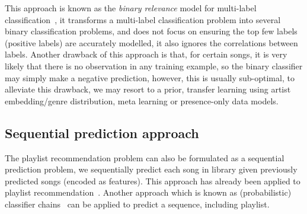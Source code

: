 This approach is known as the \emph{binary relevance} model for multi-label classification~\cite{read2011classifier},
it transforms a multi-label classification problem into several binary classification problems, 
and does not focus on ensuring the top few labels (\ie positive labels) are accurately modelled,
it also ignores the correlations between labels.
Another drawback of this approach is that, for certain songs,
it is very likely that there is no observation in any training example, 
so the binary classifier may simply make a negative prediction, however, this is usually sub-optimal, 
to alleviate this drawback, 
we may resort to a prior, transfer learning using artist embedding/genre distribution, meta learning or presence-only data models.



\subsection{Sequential prediction approach}
\label{ssec:sequential}

The playlist recommendation problem can also be formulated as a sequential prediction problem,
\ie we sequentially predict each song in library given previously predicted songs (encoded as features).
This approach has already been applied to playlist recommendation~\cite{bengroove2017}.
Another approach which is known as (probabilistic) classifier chains~\cite{dembczynski:2010,read2011classifier}
can be applied to predict a sequence, including playlist.

